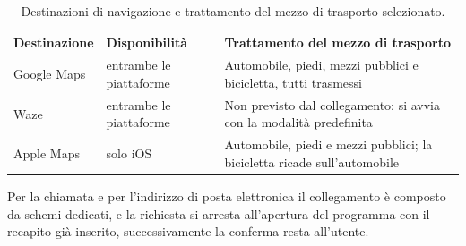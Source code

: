 \begin{table}[H]
\footnotesize
\begin{tabularx}{\textwidth}{@{}P{2.5cm} P{2.6cm} L@{}}
\toprule
\textbf{Destinazione} & \textbf{Disponibilità} & \textbf{Trattamento del mezzo di trasporto} \tabularnewline
\midrule
Google Maps & entrambe le piattaforme & Automobile, piedi, mezzi pubblici e bicicletta, tutti trasmessi \tabularnewline
Waze & entrambe le piattaforme & Non previsto dal collegamento: si avvia con la modalità predefinita \tabularnewline
Apple Maps & solo iOS & Automobile, piedi e mezzi pubblici; la bicicletta ricade sull'automobile \tabularnewline
\bottomrule
\end{tabularx}
\caption{Destinazioni di navigazione e trattamento del mezzo di trasporto selezionato.}
\label{tab:navigazione}
\end{table}


Per la chiamata e per l'indirizzo di posta elettronica il collegamento è composto da schemi dedicati, e la richiesta si arresta all'apertura del
programma con il recapito già inserito, successivamente la conferma resta all'utente.


